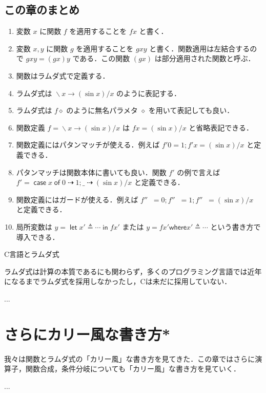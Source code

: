 \documentclass[a4paper,twocolumn]{jsbook}
\newcommand{\programminglanguage}[1]{\textsf{#1}}
\newcommand{\clang}{\programminglanguage{C}}
\newenvironment{leader}{\begingroup\gt}{\endgroup}
\newenvironment{note}[1]{\begin{boxnote}\begin{center}#1\end{center}}{\end{boxnote}}
\newcommand{\mKeyword}[1]{\mathsf{#1}} %
\newcommand{\mCaseKeyword}{\mKeyword{case}}
\newcommand{\mInKeyword}{\mKeyword{in}}
\newcommand{\mLetKeyword}{\mKeyword{let}}
\newcommand{\mOfKeyword}{\mKeyword{of}}
\newcommand{\mOtherwiseKeyword}{\mKeyword{otherwise}}
\newcommand{\mWhereKeyword}{\mKeyword{where}}
\DeclareMathOperator{\mCase}{\mCaseKeyword} %
\DeclareMathOperator{\mInKW}{\mInKeyword} %
\DeclareMathOperator{\mLet}{\mLetKeyword} %
\DeclareMathOperator{\mOf}{\mOfKeyword} %
\DeclareMathOperator{\mOtherwise}{\mOtherwiseKeyword}
\newcommand{\mAnonParam}{\diamond}
\newcommand{\mAnyParam}{\_}
\DeclareMathOperator{\mIfSo}{\dashrightarrow}
\DeclareMathOperator{\mLambda}{\backslash}
\DeclareMathOperator{\mLambdaArrow}{\rightarrow}
\DeclareMathOperator{\mLetEq}{\triangleq}
\newcommand{\mGuard}[1]{\mathop{\mid_{#1}}}
\newcommand{\mCaseOf}[1]{\mCase{#1}\mOf}
\newcommand{\mLambdaExp}[2]{\mLambda{#1}\mLambdaArrow{#2}}
\newcommand{\mLetIn}[3]{\mLet{#1\mLetEq#2}\mInKW{#3}}
\newcommand{\mWhere}[2]{\mathbin{\mWhereKeyword}#1\mLetEq#2}
\begin{document}
\section{この章のまとめ}

\begin{enumerate}
\item 変数 $x$ に関数 $f$ を適用することを $fx$ と書く．
\item 変数 $x,y$ に関数 $g$ を適用することを $gxy$ と書く．関数適用は左結合するので $gxy=(gx)y$ である．この関数 $(gx)$ は部分適用された関数と呼ぶ．
\item 関数はラムダ式で定義する．
\item ラムダ式は $\mLambdaExp{x}{(\sin x)/x}$ のように表記する．
\item ラムダ式は $f\mAnonParam$ のように無名パラメタ $\mAnonParam$ を用いて表記しても良い．
\item 関数定義 $f=\mLambdaExp{x}{(\sin x)/x}$ は $fx=(\sin x)/x$ と省略表記できる．
\item 関数定義にはパタンマッチが使える．例えば $f'0=1;f'x=(\sin x)/x$ と定義できる．
\item パタンマッチは関数本体に書いても良い．関数 $f'$ の例で言えば $f'=\mCaseOf{x}0\mIfSo1;\mAnyParam\mIfSo(\sin x)/x$ と定義できる．
\item 関数定義にはガードが使える．例えば $f''\mGuard{x<0}=0;f''\mGuard{x\equiv0}=1;f''\mGuard{\mOtherwise}=(\sin x)/x$ と定義できる．
\item 局所変数は $y=\mLetIn{x'}{\dotsb}{fx'}$ または $y=fx'\mWhere{x'}{\dotsb}$ という書き方で導入できる．
\end{enumerate}

\begin{note}{\clang 言語とラムダ式}
ラムダ式は計算の本質であるにも関わらず，多くのプログラミング言語では近年になるまでラムダ式を採用しなかったし，\clang は未だに採用していない．

...
\end{note}


\chapter{さらにカリー風な書き方*}

\begin{leader}
我々は関数とラムダ式の「カリー風」な書き方を見てきた．この章ではさらに演算子，関数合成，条件分岐についても「カリー風」な書き方を見ていく．

...
\end{leader}
\end{document}
